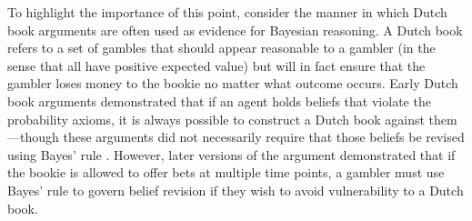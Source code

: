 \documentclass[doc,floatsintext]{apa6}
\begin{document}
To highlight the importance of this point, consider the manner in which Dutch book arguments are often used as evidence for Bayesian reasoning. A Dutch book refers to a set of gambles that should appear reasonable to a gambler (in the sense that all have positive expected value) but will in fact ensure that the gambler loses money to the bookie no matter what outcome occurs. Early Dutch book arguments demonstrated that if an agent holds beliefs that violate the probability axioms, it is always possible to construct a Dutch book against them---though these arguments did not necessarily require that those beliefs be revised using Bayes' rule \cite{de_finetti_foresight:_1980}. However, later versions of the argument \cite{teller_conditionalization_1973} demonstrated that if the bookie is allowed to offer bets at multiple time points, a gambler must use Bayes' rule to govern belief revision if they wish to avoid vulnerability to a Dutch book.
\end{document}

